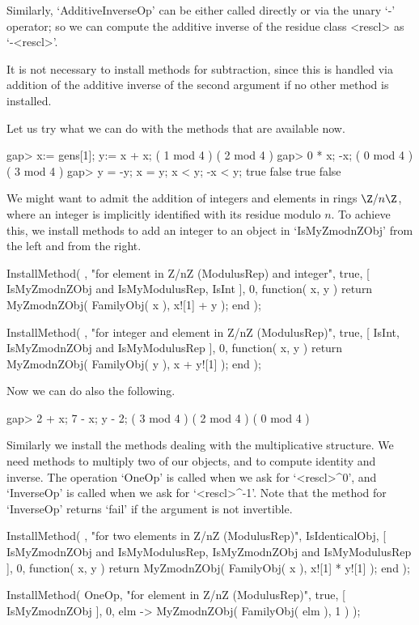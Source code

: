 Similarly, `AdditiveInverseOp' can be either called directly or via the
unary `-' operator; so we can compute the additive inverse of the
residue class <rescl> as `-<rescl>'.

It is not necessary to install methods for subtraction,
since this is handled via addition of the additive inverse of
the second argument if no other method is installed.

Let us try what we can do with the methods that are available now.

\begintt
gap> x:= gens[1];  y:= x + x;
( 1 mod 4 )
( 2 mod 4 )
gap> 0 * x;  -x;
( 0 mod 4 )
( 3 mod 4 )
gap> y = -y;  x = y;  x < y;  -x < y;
true
false
true
false
\endtt

We might want to admit the addition of integers and elements in
rings $\Z/n\Z$, where an integer is implicitly identified
with its residue modulo $n$.
To achieve this, we install methods to add an integer to an object in
`IsMyZmodnZObj' from the left and from the right.

\begintt
InstallMethod( \+,
    "for element in Z/nZ (ModulusRep) and integer",
    true,
    [ IsMyZmodnZObj and IsMyModulusRep, IsInt ], 0,
    function( x, y )
    return MyZmodnZObj( FamilyObj( x ), x![1] + y );
    end );

InstallMethod( \+,
    "for integer and element in Z/nZ (ModulusRep)",
    true,
    [ IsInt, IsMyZmodnZObj and IsMyModulusRep ], 0,
    function( x, y )
    return MyZmodnZObj( FamilyObj( y ), x + y![1] );
    end );
\endtt

Now we can do also the following.

\begintt
gap> 2 + x;  7 - x;  y - 2;
( 3 mod 4 )
( 2 mod 4 )
( 0 mod 4 )
\endtt

Similarly we install the methods dealing with the multiplicative
structure.
We need methods to multiply two of our objects,
and to compute identity and inverse.
The operation `OneOp' is called when we ask for `<rescl>^0',
and `InverseOp' is called when we ask for `<rescl>^-1'.
Note that the method for `InverseOp' returns `fail' if the argument
is not invertible.

\begintt
InstallMethod( \*,
    "for two elements in Z/nZ (ModulusRep)",
    IsIdenticalObj,
    [ IsMyZmodnZObj and IsMyModulusRep, IsMyZmodnZObj and IsMyModulusRep ],
    0,
    function( x, y )
    return MyZmodnZObj( FamilyObj( x ), x![1] * y![1] );
    end );

InstallMethod( OneOp,
    "for element in Z/nZ (ModulusRep)",
    true,
    [ IsMyZmodnZObj ], 0,
    elm -> MyZmodnZObj( FamilyObj( elm ), 1 ) );

